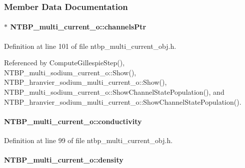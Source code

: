 \subsubsection{Member Data Documentation}
\paragraph[{channelsPtr}]{$\ast$ {\bf NTBP\_\-multi\_\-current\_\-o::channelsPtr}}\hfill\label{class_n_t_b_p__multi__current__o_a5c9a87bdd19198d7be99bda0d9bbe6b1}


Definition at line 101 of file ntbp\_\-multi\_\-current\_\-obj.h.



Referenced by ComputeGillespieStep(), NTBP\_\-multi\_\-sodium\_\-current\_\-o::Show(), NTBP\_\-hranvier\_\-sodium\_\-multi\_\-current\_\-o::Show(), NTBP\_\-multi\_\-sodium\_\-current\_\-o::ShowChannelStatePopulation(), and NTBP\_\-hranvier\_\-sodium\_\-multi\_\-current\_\-o::ShowChannelStatePopulation().

\paragraph[{conductivity}]{ {\bf NTBP\_\-multi\_\-current\_\-o::conductivity}}\hfill\label{class_n_t_b_p__multi__current__o_aa28a5de6d10d258e251e73bf1dcaba0d}


Definition at line 99 of file ntbp\_\-multi\_\-current\_\-obj.h.

\paragraph[{density}]{ {\bf NTBP\_\-multi\_\-current\_\-o::density}}\hfill\label{class_n_t_b_p__multi__current__o_a82138baaa276b09c13038ca1fd6f08a7}


